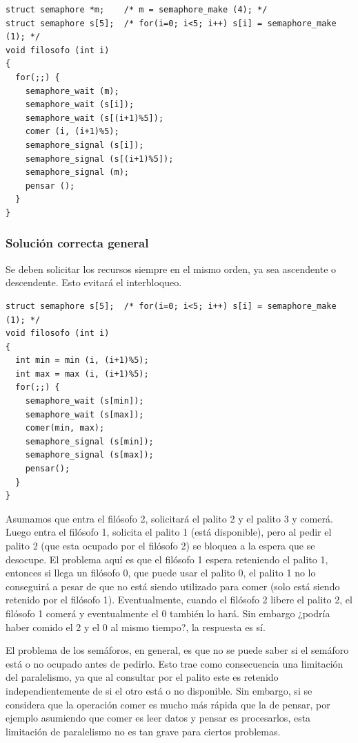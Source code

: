\begin{lstlisting}
struct semaphore *m;    /* m = semaphore_make (4); */
struct semaphore s[5];  /* for(i=0; i<5; i++) s[i] = semaphore_make (1); */
void filosofo (int i)
{
  for(;;) {
    semaphore_wait (m);
    semaphore_wait (s[i]);
    semaphore_wait (s[(i+1)%5]);
    comer (i, (i+1)%5);
    semaphore_signal (s[i]);
    semaphore_signal (s[(i+1)%5]);
    semaphore_signal (m);
    pensar ();
  }
}
\end{lstlisting}

\subsubsection{Solución correcta general}
Se deben solicitar los recursos siempre en el mismo orden, ya sea ascendente o
descendente. Esto evitará el interbloqueo.

\begin{lstlisting}
struct semaphore s[5];  /* for(i=0; i<5; i++) s[i] = semaphore_make (1); */
void filosofo (int i)
{
  int min = min (i, (i+1)%5);
  int max = max (i, (i+1)%5);
  for(;;) {
    semaphore_wait (s[min]);
    semaphore_wait (s[max]);
    comer(min, max);
    semaphore_signal (s[min]);
    semaphore_signal (s[max]);
    pensar();
  }
}
\end{lstlisting}

Asumamos que entra el filósofo 2, solicitará el palito 2 y el palito 3 y comerá.
Luego entra el filósofo 1, solicita el palito 1 (está disponible), pero al pedir
el palito 2 (que esta ocupado por el filósofo 2) se bloquea a la espera que se
desocupe. El problema aquí es que el filósofo 1 espera reteniendo el palito 1,
entonces si llega un filósofo 0, que puede usar el palito 0, el palito 1 no lo
conseguirá a pesar de que no está siendo utilizado para comer (solo está siendo
retenido por el filósofo 1). Eventualmente, cuando el filósofo 2 libere el
palito 2, el filósofo 1 comerá y eventualmente el 0 también lo hará. Sin embargo
¿podría haber comido el 2 y el 0 al mismo tiempo?, la respuesta es sí.

El problema de los semáforos, en general, es que no se puede saber si el
semáforo está o no ocupado antes de pedirlo. Esto trae como consecuencia una
limitación del paralelismo, ya que al consultar por el palito este es retenido
independientemente de si el otro está o no disponible. Sin embargo, si se
considera que la operación comer es mucho más rápida que la de pensar, por
ejemplo asumiendo que comer es leer datos y pensar es procesarlos, esta
limitación de paralelismo no es tan grave para ciertos problemas.

